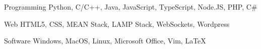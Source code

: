 


\begin{cvskills}


\cvskill
{Programming} %
{Python, C/C++, Java, JavaScript, TypeScript, Node.JS, PHP, C\#} %


\cvskill
{Web} %
{HTML5, CSS, MEAN Stack, LAMP Stack, WebSockets, Wordpress} %


\cvskill
{Software} %
{Windows, MacOS, Linux, Microsoft Office, Vim, LaTeX} %


\end{cvskills}